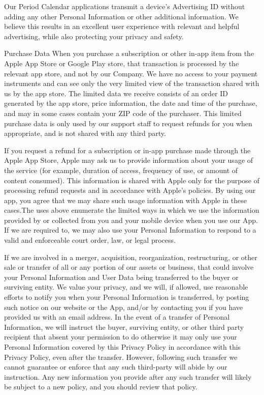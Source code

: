 Our Period Calendar applications transmit a device’s Advertising ID without adding any other Personal Information or other additional information. We believe this results in an excellent user experience with relevant and helpful advertising, while also protecting your privacy and safety.

Purchase Data
When you purchase a subscription or other in-app item from the Apple App Store or Google Play store, that transaction is processed by the relevant app store, and not by our Company. We have no access to your payment instruments and can see only the very limited view of the transaction shared with us by the app store. The limited data we receive consists of an order ID generated by the app store, price information, the date and time of the purchase, and may in some cases contain your ZIP code of the purchaser. This limited purchase data is only used by our support staff to request refunds for you when appropriate, and is not shared with any third party.

If you request a refund for a subscription or in-app purchase made through the Apple App Store, Apple may ask us to provide information about your usage of the service (for example, duration of access, frequency of use, or amount of content consumed). This information is shared with Apple only for the purpose of processing refund requests and in accordance with Apple’s policies. By using our app, you agree that we may share such usage information with Apple in these cases.The uses above enumerate the limited ways in which we use the information provided by or collected from you and your mobile device when you use our App. If we are required to, we may also use your Personal Information to respond to a valid and enforceable court order, law, or legal process.

If we are involved in a merger, acquisition, reorganization, restructuring, or other sale or transfer of all or any portion of our assets or business, that could involve your Personal Information and User Data being transferred to the buyer or surviving entity. We value your privacy, and we will, if allowed, use reasonable efforts to notify you when your Personal Information is transferred, by posting such notice on our website or the App, and/or by contacting you if you have provided us with an email address. In the event of a transfer of Personal Information, we will instruct the buyer, surviving entity, or other third party recipient that absent your permission to do otherwise it may only use your Personal Information covered by this Privacy Policy in accordance with this Privacy Policy, even after the transfer. However, following such transfer we cannot guarantee or enforce that any such third-party will abide by our instruction. Any new information you provide after any such transfer will likely be subject to a new policy, and you should review that policy.

